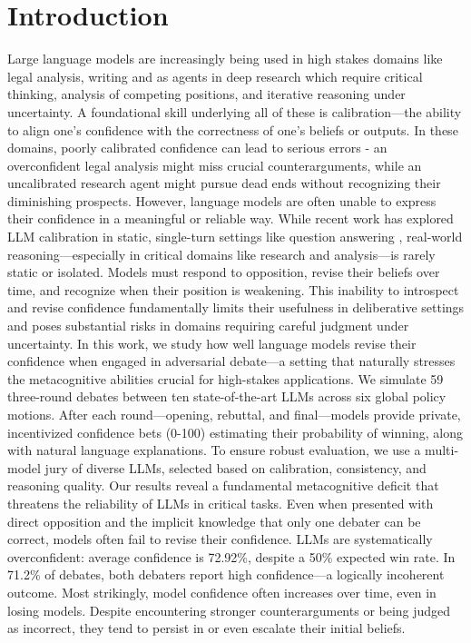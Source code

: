 \documentclass{article}
\begin{document}
\section{Introduction}
Large language models are increasingly being used in high stakes domains like legal analysis, writing and as agents in deep research \cite{handa2025economictasksperformedai} \cite{zheng2025deepresearcherscalingdeepresearch} which require critical thinking, analysis of competing positions, and iterative reasoning under uncertainty. A foundational skill underlying all of these is calibration—the ability to align one's confidence with the correctness of one's beliefs or outputs. In these domains, poorly calibrated confidence can lead to serious errors - an overconfident legal analysis might miss crucial counterarguments, while an uncalibrated research agent might pursue dead ends without recognizing their diminishing prospects.
However, language models are often unable to express their confidence in a meaningful or reliable way. While recent work has explored LLM calibration in static, single-turn settings like question answering \citep{tian2023justask, xiong2024uncertainty, kadavath2022know}, real-world reasoning—especially in critical domains like research and analysis—is rarely static or isolated. Models must respond to opposition, revise their beliefs over time, and recognize when their position is weakening. This inability to introspect and revise confidence fundamentally limits their usefulness in deliberative settings and poses substantial risks in domains requiring careful judgment under uncertainty.
In this work, we study how well language models revise their confidence when engaged in adversarial debate—a setting that naturally stresses the metacognitive abilities crucial for high-stakes applications. We simulate 59 three-round debates between ten state-of-the-art LLMs across six global policy motions. After each round—opening, rebuttal, and final—models provide private, incentivized confidence bets (0-100) estimating their probability of winning, along with natural language explanations. To ensure robust evaluation, we use a multi-model jury of diverse LLMs, selected based on calibration, consistency, and reasoning quality.
Our results reveal a fundamental metacognitive deficit that threatens the reliability of LLMs in critical tasks. Even when presented with direct opposition and the implicit knowledge that only one debater can be correct, models often fail to revise their confidence. LLMs are systematically overconfident: average confidence is 72.92\%, despite a 50\% expected win rate. In 71.2\% of debates, both debaters report high confidence—a logically incoherent outcome. Most strikingly, model confidence often increases over time, even in losing models. Despite encountering stronger counterarguments or being judged as incorrect, they tend to persist in or even escalate their initial beliefs.
\end{document}
